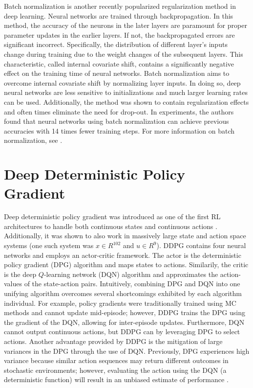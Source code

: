 Batch normalization is another recently popularized regularization method in deep learning.  Neural networks are trained through backpropagation.  In this method, the accuracy of the neurons in the later layers are paramount for proper parameter updates in the earlier layers.  If not, the backpropagated errors are significant incorrect. Specifically, the distribution of different layer's inputs change during training due to the weight changes of the subsequent layers. This characteristic, called internal covariate shift, contains a significantly negative effect on the training time of neural networks.  Batch normalization aims to overcome internal covariate shift by normalizing layer inputs.  In doing so, deep neural networks are less sensitive to initializations and much larger learning rates can be used. Additionally, the method was shown to contain regularization effects and often times eliminate the need for drop-out.  In experiments, the authors found that neural networks using batch normalization can achieve previous accuracies with 14 times fewer training steps.  For more information on batch normalization, see \cite{batch_norm}.





\section{Deep Deterministic Policy Gradient}
Deep deterministic policy gradient was introduced as one of the first RL architectures to handle both continuous states and continuous actions \cite{ddpg}. Additionally, it was shown to also work in massively large state and action space systems (one such system was $x \in R^{102}$ and $u \in R^{9}$). DDPG contains four neural networks and employs an actor-critic framework.  The actor is the deterministic policy gradient (DPG) algorithm and maps states to actions.  Similarily, the critic is the deep $Q$-learning network (DQN) algorithm and approximates the action-values of the state-action pairs. Intuitively, combining DPG and DQN into one unifying algorithm overcomes several shortcomings exhibited by each algorithm individual. For example, policy gradients were traditionally trained using MC methods and cannot update mid-episode; however, DDPG trains the DPG using the gradient of the DQN, allowing for inter-episode updates. Furthermore, DQN cannot output continuous actions, but DDPG can by leveraging DPG to select actions.  Another advantage provided by DDPG is the mitigation of large variances in the DPG through the use of DQN.  Previously, DPG experiences high variance because similar action sequences may return different outcomes in stochastic environments; however, evaluating the action using the DQN (a deterministic function) will result in an unbiased estimate of performance \cite{ddpg}.  

